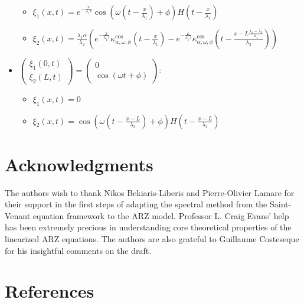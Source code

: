 \documentclass[preprint]{elsarticle}
\begin{document}
\begin{itemize}
\begin{itemize}
\item $\xi_{1}\left(x,t\right)=e^{-\frac{x}{\lambda_{1}\tau}}\cos\left(\omega\left(t-\frac{x}{\lambda_{1}}\right)+\phi\right)H\left(t-\frac{x}{\lambda_{1}}\right)$
\item $\xi_{2}\left(x,t\right)=\frac{\lambda_{1}\alpha}{\lambda_{2}}\left(e^{-\frac{x}{\lambda_{1}\tau}}\kappa_{\alpha,\omega,\phi}^{\text{cos}}\left(t-\frac{x}{\lambda_{1}}\right)-e^{-\frac{L}{\lambda_{1}\tau}}\kappa_{\alpha,\omega,\phi}^{\text{cos}}\left(t-\frac{x-L\frac{\lambda_{1}-\lambda_{2}}{\lambda_{1}}}{\lambda_{2}}\right)\right)$
\end{itemize}
\item $\left(\begin{array}{c}
\xi_{1}\left(0,t\right)\\
\xi_{2}\left(L,t\right)
\end{array}\right)=\left(\begin{array}{c}
0\\
\cos\left(\omega t+\phi\right)
\end{array}\right)$:

\begin{itemize}
\item $\xi_{1}\left(x,t\right)=0$
\item $\xi_{2}\left(x,t\right)=\cos\left(\omega\left(t-\frac{x-L}{\lambda_{2}}\right)+\phi\right)H\left(t-\frac{x-L}{\lambda_{2}}\right)$\end{itemize}
\end{itemize}

\section*{Acknowledgments}
The authors wish to thank Nikos Bekiaris-Liberis and Pierre-Olivier Lamare for their support in the first steps of adapting the spectral method from the Saint-Venant equation framework to the ARZ model. Professor L. Craig Evans' help has been extremely precious in understanding core theoretical properties of the linearized ARZ equations. The authors are also grateful to Guillaume Costeseque for his insightful comments on the draft.


\section*{References}


\end{document}
